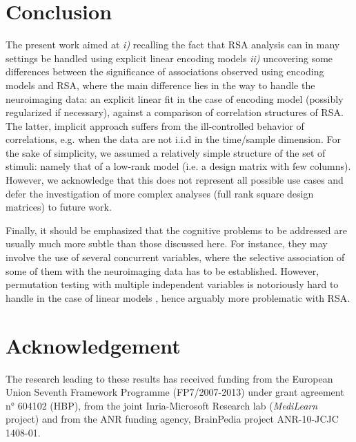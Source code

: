 \documentclass{article}
\begin{document}
\section{Conclusion}
The present work aimed at \textit{i)} recalling the fact that RSA
analysis can in many settings be handled using explicit linear
encoding models \textit{ii)} uncovering some differences between the
significance of associations observed using encoding models and RSA,
where the main difference lies in the way to handle the neuroimaging
data: an explicit linear fit in the case of encoding model (possibly
regularized if necessary), against a comparison of correlation
structures of RSA.
%
The latter, implicit approach suffers from the ill-controlled behavior
of correlations, e.g. when the data are not i.i.d in the time/sample
dimension.
%
For the sake of simplicity, we assumed a relatively simple structure of
the set of stimuli: namely that of a low-rank model (i.e. a design
matrix with few columns). 
%
However, we acknowledge that this does not represent all possible use
cases and defer the investigation of more complex analyses (full rank
square design matrices) to future work.

Finally, it should be emphasized that the cognitive problems to be
addressed are usually much more subtle than those discussed here. 
%
For instance, they may involve the use of several concurrent variables,
where the selective association of some of them with the neuroimaging
data has to be established.
%
However, permutation testing with multiple independent variables is
notoriously hard to handle in the case of linear models
\cite{Anderson2001}, hence arguably more problematic with RSA.

\section*{Acknowledgement}
The research leading to these results has received funding from the
European Union Seventh Framework Programme (FP7/2007-2013) under grant
agreement n° 604102 (HBP), from the joint Inria-Microsoft Research lab
(\textit{MediLearn} project) and from the ANR funding agency,
BrainPedia project ANR-10-JCJC 1408-01.



\end{document}
